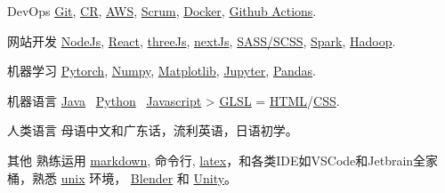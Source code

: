 
\begin{cvskills}

  \cvskill
    {DevOps} %
    {\href{https://git-scm.com/}{Git}, \href{https://en.wikipedia.org/wiki/Code_review}{CR}, \href{https://aws.amazon.com/}{AWS}, \href{https://www.scrum.org/resources/what-is-scrum}{Scrum}, \href{https://www.docker.com/}{Docker}, \href{https://github.com/features/actions}{Github Actions}.}

  \cvskill
    {网站开发} %
    {\href{https://nodejs.org/en/}{NodeJs}, \href{https://reactjs.org/}{React}, \href{https://threejs.org/}{threeJs}, \href{https://nextjs.org/}{nextJs}, \href{https://sass-lang.com/}{SASS/SCSS}, \href{https://spark.apache.org/}{Spark}, \href{https://hadoop.apache.org/}{Hadoop}.}

  \cvskill
    {机器学习} %
    {\href{https://pytorch.org/}{Pytorch}, \href{https://numpy.org/}{Numpy}, \href{https://matplotlib.org/}{Matplotlib}, \href{https://jupyter.org/}{Jupyter}, \href{https://pandas.pydata.org/}{Pandas}.}  %

  \cvskill
    {机器语言}
    {\href{https://www.java.com/en/}{Java} \approx\, \href{https://www.python.org/}{Python} \approx\, \href{https://www.javascript.com/}{Javascript} > \href{https://www.khronos.org/opengl/wiki/OpenGL_Shading_Language}{GLSL} = \href{https://developer.mozilla.org/en-US/docs/Glossary/HTML5}{HTML}/\href{https://developer.mozilla.org/en-US/docs/Web/CSS}{CSS}.}

  \cvskill
    {人类语言}
    {母语中文和广东话，流利英语，日语初学。}

  \cvskill
    {其他} %
    {熟练运用 \href{https://en.wikipedia.org/wiki/Markdown}{markdown}, 命令行, \href{https://www.latex-project.org/}{latex}，和各类IDE如VSCode和Jetbrain全家桶，熟悉 \href{https://en.wikipedia.org/wiki/Unix}{unix} 环境， \href{https://www.blender.org/}{Blender} 和 \href{https://unity.com/}{Unity}。}

\end{cvskills}

